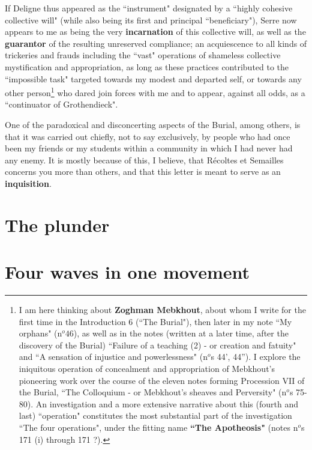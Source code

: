 If Deligne thus appeared as the ``instrument" designated by a ``highly cohesive collective will" (while also being its first and principal ``beneficiary"), Serre now appears to me as being the very \textbf{incarnation} of this collective will, as well as the \textbf{guarantor} of the resulting unreserved compliance; an acquiescence to all kinds of trickeries and frauds including the ``vast" operations of shameless collective mystification and appropriation, as long as these practices contributed to the ``impossible task" targeted towards my modest and departed self, or towards any other person\footnote{I am here thinking about \textbf{Zoghman Mebkhout}, about whom I write for the first time in the Introduction 6 (``The Burial"), then later in my note ``My orphans" (n$^o 46$), as well as in the notes (written at a later time, after the discovery of the Burial) ``Failure of a teaching (2) - or creation and fatuity" and ``A sensation of injustice and powerlessness" (n$^o$s 44', 44''). I explore the iniquitous operation of concealment and appropriation of Mebkhout's pioneering work over the course of the eleven notes forming Procession VII of the Burial, ``The Colloquium - or Mebkhout's sheaves and Perversity" (n$^o$s 75-80). An investigation and a more extensive narrative about this (fourth and last) ``operation" constitutes the most substantial part of the investigation ``The four operations", under the fitting name \textbf{``The Apotheosis"} (notes n$^o$s 171 (i) through 171 ?).} who dared join forces with me and to appear, against all odds, as a ``continuator of Grothendieck".

One of the paradoxical and disconcerting aspects of the Burial, among others, is that it was carried out chiefly, not to say exclusively, by people who had once been my friends or my students within a community in which I had never had any enemy. It is mostly because of this, I believe, that R\'ecoltes et Semailles concerns you more than others, and that this letter is meant to serve as an \textbf{inquisition}.  










\section{The plunder}

\section{Four waves in one movement}

